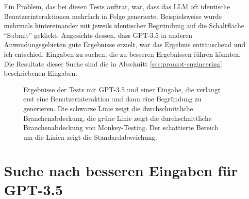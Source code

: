 Ein Problem, das bei diesen Tests auftrat, war, dass das LLM oft identische Benutzerinteraktionen mehrfach in Folge generierte.
Beispielsweise wurde mehrmals hintereinander mit jeweils identischer Begründung auf die Schaltfläche \enquote{Submit} geklickt.
Angesichts dessen, dass GPT-3.5 in anderen Anwendungsgebieten gute Ergebnisse erzielt, war das Ergebnis enttäuschend und ich entschied, Eingaben zu suchen, die zu besseren Ergebnissen führen könnten.
Die Resultate dieser Suche sind die in Abschnitt \ref{sec:prompt-engineering} beschriebenen Eingaben.

\begin{figure}[h]
    \centering
    \caption{Ergebnisse der Tests mit GPT-3.5 und einer Eingabe, die verlangt erst eine Benutzerinteraktion und dann eine Begründung zu generieren. Die schwarze Linie zeigt die durchschnittliche Branchenabdeckung, die grüne Linie zeigt die durchschnittliche Branchenabdeckung von Monkey-Testing. Der schattierte Bereich um die Linien zeigt die Standardabweichung.}
    \label{fig:gpt3_5_explain_after}
\end{figure}

\section{Suche nach besseren Eingaben für GPT-3.5}
\label{sec:prompt-engineering:2}


